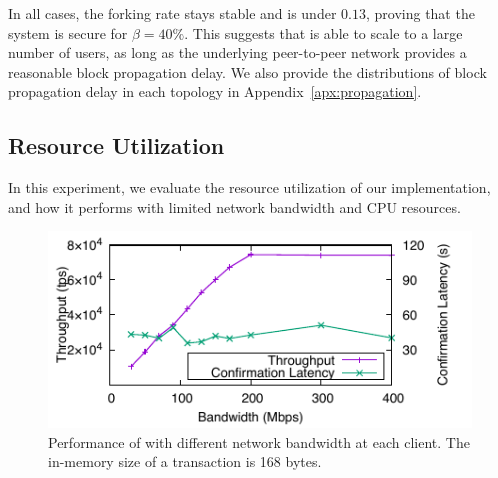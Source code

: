 In all cases, the forking rate stays stable and is under $0.13$, proving that the system is secure for $\beta=40\%$. This suggests that \prism is able to scale to a large number of users, as long as the underlying peer-to-peer network provides a reasonable block propagation delay. We also provide the distributions of block propagation delay in each topology in Appendix~\ref{apx:propagation}.

\subsection{Resource Utilization}
\label{sec:eval-resource}

In this experiment, we evaluate the resource utilization of our \prism implementation, and how it performs with limited network bandwidth and CPU resources. 





\begin{figure}
    \centering
    \includegraphics{figures/resource-fig-bw.pdf}
        \vspace{-2mm}
    \caption{\small Performance of \prism with different network bandwidth at each client. The in-memory size of a transaction is 168 bytes.}
    \label{fig:bw}
    \vspace{-2mm}
\end{figure}


